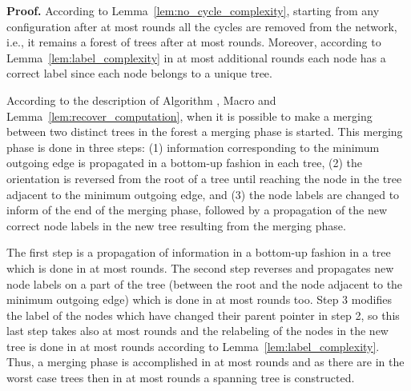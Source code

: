 \documentclass[11pt,a4paper]{article}
\newenvironment{proof}{\noindent \begin{rm}{\textbf{Proof.} }}{\hspace*{\fill}\par\end{rm}}
\begin{document}
\begin{proof}
According to Lemma~\ref{lem:no_cycle_complexity}, starting from any configuration after at most  rounds all the cycles are removed from the network, i.e., it remains a forest of trees after at most  rounds. Moreover, according to Lemma~\ref{lem:label_complexity} in at most  additional rounds each node  has a correct label since each node belongs to a unique tree.



According to the description of Algorithm , Macro  and Lemma~\ref{lem:recover_computation}, when it is possible to make a merging between two distinct trees in the forest a merging phase is started. This merging phase is done in three steps: (1) information corresponding to the minimum outgoing edge is propagated in a bottom-up fashion in each tree, (2) the orientation is reversed from the root of a tree until reaching the node in the tree adjacent to the minimum outgoing edge, and (3) the node labels are changed to inform of the end of the merging phase, followed by a propagation of the new correct node labels in the new tree resulting from the merging phase.

The first step is a propagation of information in a bottom-up fashion in a tree which is done in at most  rounds. The second step reverses and propagates new node labels on a part of the tree (between the root and the node adjacent to the minimum outgoing edge) which is done in at most  rounds too. Step 3 modifies the label of the nodes which have changed their parent pointer in step 2, so this last step takes also at most  rounds and the relabeling of the nodes in the new tree is done in at most  rounds according to Lemma~\ref{lem:label_complexity}. Thus, a merging phase is accomplished in at most  rounds and as there are in the worst case  trees then in at most  rounds a spanning tree is constructed.


\end{proof}
\end{document}
